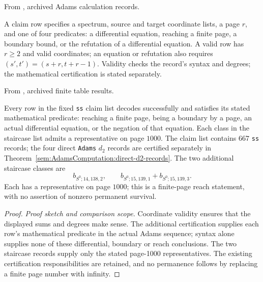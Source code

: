 \begin{theorem}
\label{sem:Computation:table-certification}
From \cite{LinProgram}, archived Adams calculation records.\par
A claim row specifies a spectrum, source and target coordinate lists, a page $r$, and one of four predicates: a differential equation, reaching a finite page, a boundary bound, or the refutation of a differential equation. A valid row has $r\geq2$ and valid coordinates; an equation or refutation also requires $(s\prime,t\prime)=(s+r,t+r-1)$. Validity checks the record's syntax and degrees; the mathematical certification is stated separately.

From \cite{LinProgram}, archived finite table results.\par
Every row in the fixed \texttt{ss} claim list decodes successfully and satisfies its stated mathematical predicate: reaching a finite page, being a boundary by a page, an actual differential equation, or the negation of that equation. Each class in the staircase list admits a representative on page $1000$.
The claim list contains $667$ \texttt{ss} records; the four direct
\texttt{Adams} $d_2$ records are certified separately in
Theorem~\ref{sem:AdamsComputation:direct-d2-records}.
The two additional staircase classes are
\[
b_{S^0;14,138,2},\qquad b_{S^0;15,139,1}+b_{S^0;15,139,3}.
\]
Each has a representative on page $1000$; this is a finite-page reach
statement, with no assertion of nonzero permanent survival.
\end{theorem}
\begin{proof}
\textit{Proof sketch and comparison scope.}
Coordinate validity ensures that the displayed sums and degrees make
sense. The additional certification supplies each row's mathematical
predicate in the actual Adams sequence; syntax alone supplies none of
these differential, boundary or reach conclusions. The two staircase
records supply only the stated page-1000 representatives. The existing
certification responsibilities are retained, and no permanence follows
by replacing a finite page number with infinity.
\end{proof}


